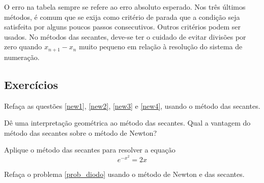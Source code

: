 \begin{obs}
O erro na tabela sempre se refere ao erro absoluto esperado. Nos três últimos métodos, é comum que se exija como critério de parada que a condição seja satisfeita por alguns poucos passos consecutivos. Outros critérios podem ser usados. No métodos das secantes, deve-se ter o cuidado de evitar divisões por zero quando $x_{n+1}-x_n$ muito pequeno em relação à resolução do sistema de numeração.  
\end{obs}

\subsection*{Exercícios}

\begin{exer} Refaça as questões \ref{new1}, \ref{new2}, \ref{new3}  e \ref{new4}, usando o método das secantes.
\end{exer}

\begin{exer} Dê uma interpretação geométrica ao método das secantes. Qual a vantagem do método das secantes sobre o método de Newton?
\end{exer}

\begin{exer} Aplique o método das secantes para resolver a equação
  \begin{equation*}
    e^{-x^2}=2x  
  \end{equation*}
\end{exer}

\begin{exer} Refaça o problema \ref{prob_diodo} usando o método de Newton e das secantes.
\end{exer}

